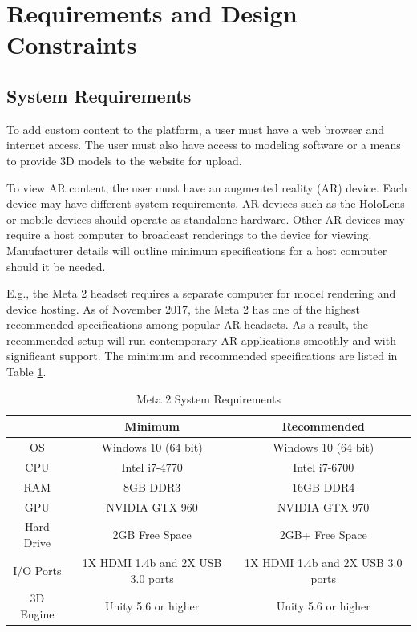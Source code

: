 
\section{Requirements and Design Constraints}

\subsection{System Requirements}

To add custom content to the platform, a user must have a web browser and internet access. The user must also have access to modeling software or a means to provide 3D models to the website for upload.

To view AR content, the user must have an augmented reality (AR) device. Each device may have different system requirements. AR devices such as the HoloLens or mobile devices should operate as standalone hardware. Other AR devices may require a host computer to broadcast renderings to the device for viewing. Manufacturer details will outline minimum specifications for a host computer should it be needed.

E.g., the Meta 2 headset requires a separate computer for model rendering and device hosting. As of November 2017, the Meta 2 has one of the highest recommended specifications among popular AR headsets. As a result, the recommended setup will run contemporary AR applications smoothly and with significant support. The minimum and recommended specifications are listed in Table \ref{table:metatwosystemrequirements}.

\begin{table}[H]
	\centering
	\begin{tabular}{ | c | c | c | }
		\hline
		& Minimum & Recommended \\ \hline
		OS & Windows 10 (64 bit) & 	Windows 10 (64 bit) \\ \hline
		CPU & Intel i7-4770 & Intel i7-6700 \\ \hline
		RAM & 8GB DDR3 & 16GB DDR4 \\ \hline
		GPU & NVIDIA GTX 960 & NVIDIA GTX 970 \\ \hline
		Hard Drive & 2GB Free Space & 2GB+ Free Space \\ \hline
		I/O Ports & 1X HDMI 1.4b and 2X USB 3.0 ports & 1X HDMI 1.4b and 2X USB 3.0 ports \\ \hline
		3D Engine & Unity 5.6 or higher & Unity 5.6 or higher \\ \hline
	\end{tabular}

	\caption{Meta 2 System Requirements}
	\label{table:metatwosystemrequirements}
\end{table}

